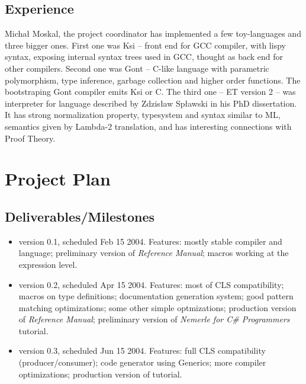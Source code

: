 \documentclass[a4paper,11pt]{article}
\begin{document}


\subsection{Experience}

Micha{\l} Moskal, the project coordinator has implemented a few
toy-languages and three bigger ones. First one was Ksi -- front end for
GCC compiler, with lispy syntax, exposing internal syntax trees used in
GCC, thought as back end for other compilers.  Second one was Gont --
C-like language with parametric polymorphism, type inference, garbage
collection and higher order functions. The bootstraping Gont compiler
emits Ksi or C. The third one -- ET version 2 -- was interpreter for
language described by Zdzis{\l}aw Sp{\l}awski in his PhD dissertation.
It has strong normalization property, typesystem and syntax similar to ML,
semantics given by Lambda-2 translation, and has interesting connections
with Proof Theory.


\section{Project Plan}

\subsection{Deliverables/Milestones}
\begin{itemize}
\item version 0.1, scheduled Feb 15 2004. Features:
  mostly stable compiler and language;
  preliminary version of \textit{Reference Manual}; 
  macros working at the expression level.

\item version 0.2, scheduled Apr 15 2004. Features:
  most of CLS compatibility;
  macros on type definitions;
  documentation generation system;
  good pattern matching optimizations;
  some other simple optmizations;
  production version of \textit{Reference Manual};
  preliminary version of \textit{Nemerle for C\# Programmers} tutorial.
  
\item version 0.3, scheduled Jun 15 2004. Features:
  full CLS compatibility (producer/consumer);
  code generator using Generics;
  more compiler optimizations;
  production version of tutorial.
\end{itemize}
\end{document}
